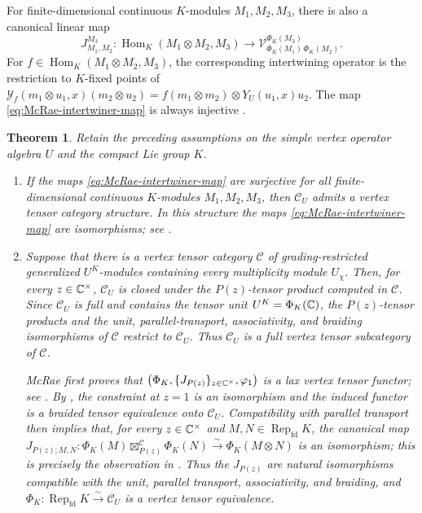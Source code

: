 \documentclass[10pt,a4paper]{amsart}
\numberwithin{equation}{section} \newtheorem{thm}{Theorem}[section] \newtheorem{lem}[thm]{Lemma} \newtheorem{ex}[thm]{Example} \newtheorem{prop}[thm]{Proposition} \newtheorem{cor}[thm]{Corollary} \newtheorem{defi}[thm]{Definition} \newtheorem{rmk}[thm]{Remark} \newtheorem{notation}[thm]{Notation}
\newcommand{\Rep}{\operatorname{Rep}}
\newcommand{\Hom}{\operatorname{Hom}}
\begin{document}
For finite-dimensional continuous $K$-modules $M_1,M_2,M_3$, there is also a canonical linear map
\begin{equation}\label{eq:McRae-intertwiner-map}
 J^{M_3}_{M_1,M_2}:
 \Hom_K(M_1\otimes M_2,M_3)
 \longrightarrow
 \mathcal V^{\Phi_K(M_3)}_{\Phi_K(M_1)\,\Phi_K(M_2)}.
\end{equation}
For $f\in\Hom_K(M_1\otimes M_2,M_3)$, the corresponding intertwining operator is the restriction to $K$-fixed points of \(\mathcal Y_f(m_1\otimes u_1,x)(m_2\otimes u_2)=f(m_1\otimes m_2)\otimes Y_U(u_1,x)u_2.\) The map \eqref{eq:McRae-intertwiner-map} is always injective \cite[\S3.2]{McRae}.

\begin{thm}
\label{thm:McRae-VOA-orbifold}
Retain the preceding assumptions on the simple vertex operator algebra $U$ and the compact Lie group $K$.

\begin{enumerate}[label=\textnormal{(\roman*)}]
\item
If the maps \eqref{eq:McRae-intertwiner-map} are surjective for all finite-dimensional continuous $K$-modules $M_1,M_2,M_3$, then $\mathcal C_U$ admits a vertex tensor category structure. In this structure the maps \eqref{eq:McRae-intertwiner-map} are isomorphisms; see \cite[Theorem~4.1]{McRae}.

\item
Suppose that there is a vertex tensor category $\mathcal C$ of grading-restricted generalized $U^K$-modules containing every multiplicity module $U_\chi$. Then, for every $z\in\mathbb{C}^\times$, $\mathcal C_U$ is closed under the $P(z)$-tensor product computed in $\mathcal C$. Since $\mathcal C_U$ is full and contains the tensor unit $U^K=\Phi_K(\mathbb{C})$, the $P(z)$-tensor products and the unit, parallel-transport, associativity, and braiding isomorphisms of $\mathcal C$ restrict to $\mathcal C_U$. Thus $\mathcal C_U$ is a full vertex tensor subcategory of $\mathcal C$.

McRae first proves that \(\bigl(\Phi_K,\{J_{P(z)}\}_{z\in\mathbb{C}^\times},\varphi_1\bigr)\) is a lax vertex tensor functor; see \cite[Theorem~4.5]{McRae}. By \cite[Corollary~4.8]{McRae}, the constraint at $z=1$ is an isomorphism and the induced functor is a braided tensor equivalence onto $\mathcal C_U$. Compatibility with parallel transport then implies that, for every $z\in\mathbb{C}^\times$ and $M,N\in\Rep_{\mathrm{fd}}K$, the canonical map \(J_{P(z);M,N}: \Phi_K(M)\boxtimes^{\mathcal C}_{P(z)}\Phi_K(N) \overset{\sim}{\longrightarrow} \Phi_K(M\otimes N)\) is an isomorphism; this is precisely the observation in \cite[Remark~4.10]{McRae}. Thus the $J_{P(z)}$ are natural isomorphisms compatible with the unit, parallel transport, associativity, and braiding, and \(\Phi_K:\Rep_{\mathrm{fd}}K\overset{\sim}{\longrightarrow}\mathcal C_U\) is a vertex tensor equivalence.


\end{enumerate}
\end{thm}
\end{document}
